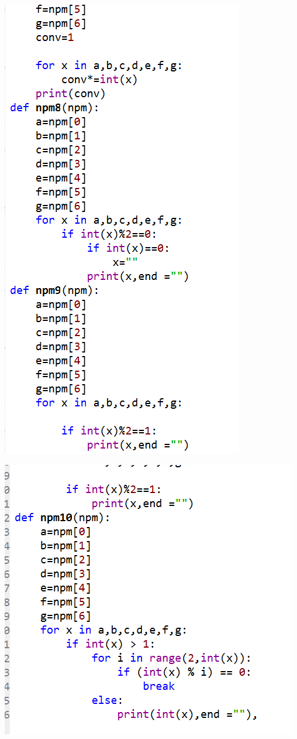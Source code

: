 \documentclass[a4paper, 12pt]{article}
\begin{document}
\begin{center}
\includegraphics[width=.8\textwidth]{figure/11cPNG.PNG}
\end{center}
\begin{center}
\includegraphics[width=.8\textwidth]{figure/11dPNG.PNG}
\end{center}
\end{document}
